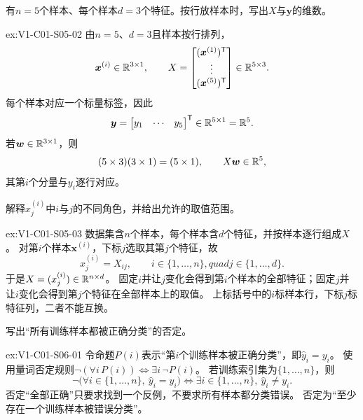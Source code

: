 \begin{SLChapterExercisePairSection}
\begin{exercise}[数据矩阵]\label{ex:V1-C01-S05-02}
有$n=5$个样本、每个样本$d=3$个特征。按行放样本时，写出$X$与$\boldsymbol{y}$的维数。
\end{exercise}
\label{sol:V1-C01-S05-02}
\begin{chapterexercisesolution}{ex:V1-C01-S05-02}
由$n=5$、$d=3$且样本按行排列，
\[
\boldsymbol{x}^{(i)}\in\mathbb{R}^{3\times1},\qquad
X=
\begin{bmatrix}
(\boldsymbol{x}^{(1)})^{\mathsf T}\\
\vdots\\
(\boldsymbol{x}^{(5)})^{\mathsf T}
\end{bmatrix}
\in\mathbb{R}^{5\times3}.
\]
每个样本对应一个标量标签，因此
\[
\boldsymbol{y}=
\begin{bmatrix}y_1&\cdots&y_5\end{bmatrix}^{\mathsf T}
\in\mathbb{R}^{5\times1}=\mathbb{R}^5.
\]
若$\boldsymbol{w}\in\mathbb{R}^{3\times1}$，则
\[
(5\times3)(3\times1)=(5\times1),
\qquad X\boldsymbol{w}\in\mathbb{R}^5,
\]
其第$i$个分量与$y_i$逐行对应。
\end{chapterexercisesolution}

\begin{exercise}[双重下标]\label{ex:V1-C01-S05-03}
解释$x^{(i)}_j$中$i$与$j$的不同角色，并给出允许的取值范围。
\end{exercise}
\label{sol:V1-C01-S05-03}
\begin{chapterexercisesolution}{ex:V1-C01-S05-03}
\SolGiven 数据集含$n$个样本，每个样本含$d$个特征，并按样本逐行组成$X$。
\SolDerive 对第$i$个样本$\boldsymbol{x}^{(i)}$，下标$j$选取其第$j$个特征，故
\[
x_j^{(i)}=X_{ij},\qquad
i\in\{1,\ldots,n\},quad j\in\{1,\ldots,d\}.
\]
于是$X=(x_j^{(i)})\in\mathbb{R}^{n\times d}$。
\SolCheck 固定$i$并让$j$变化会得到第$i$个样本的全部特征；固定$j$并让$i$变化会得到第$j$个特征在全部样本上的取值。
\SolAnswer 上标括号中的$i$标样本行，下标$j$标特征列，二者不能互换。
\end{chapterexercisesolution}

\begin{exercise}[量词否定]\label{ex:V1-C01-S06-01}
写出“所有训练样本都被正确分类”的否定。
\end{exercise}
\label{sol:V1-C01-S06-01}
\begin{chapterexercisesolution}{ex:V1-C01-S06-01}
\SolGiven 令命题$P(i)$表示“第$i$个训练样本被正确分类”，即$\widehat y_i=y_i$。
\SolPlan 使用量词否定规则$\neg(\forall i\,P(i))\Leftrightarrow\exists i\,\neg P(i)$。
\SolDerive 若训练索引集为$\{1,\ldots,n\}$，则
\[
\neg\bigl(\forall i\in\{1,\ldots,n\},\ \widehat y_i=y_i\bigr)
\Longleftrightarrow
\exists i\in\{1,\ldots,n\},\ \widehat y_i\ne y_i.
\]
\SolCheck 否定“全部正确”只要求找到一个反例，不要求所有样本都分类错误。
\SolAnswer 否定为“至少存在一个训练样本被错误分类”。
\end{chapterexercisesolution}


\end{SLChapterExercisePairSection}
